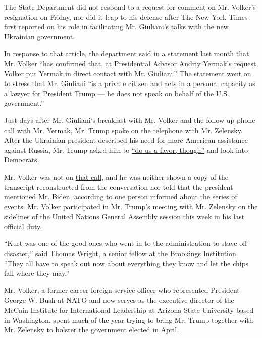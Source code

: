 The State Department did not respond to a request for comment on Mr.
Volker's resignation on Friday, nor did it leap to his defense after The
New York Times
\href{https://www.nytimes.com/2019/08/21/us/politics/giuliani-ukraine.html}{first
reported on his role} in facilitating Mr. Giuliani's talks with the new
Ukrainian government.

In response to that article, the department said in a statement last
month that Mr. Volker ``has confirmed that, at Presidential Advisor
Andriy Yermak's request, Volker put Yermak in direct contact with Mr.
Giuliani.'' The statement went on to stress that Mr. Giuliani ``is a
private citizen and acts in a personal capacity as a lawyer for
President Trump --- he does not speak on behalf of the U.S.
government.''

Just days after Mr. Giuliani's breakfast with Mr. Volker and the
follow-up phone call with Mr. Yermak, Mr. Trump spoke on the telephone
with Mr. Zelensky. After the Ukrainian president described his need for
more American assistance against Russia, Mr. Trump asked him to
\href{https://www.nytimes.com/2019/09/25/us/politics/donald-trump-impeachment-probe.html?module=inline}{``do
us a favor, though''} and look into Democrats.

Mr. Volker was not on
\href{https://www.nytimes.com/2019/09/26/us/politics/trump-ukraine-timeline.html?module=inline}{that
call}, and he was neither shown a copy of the transcript reconstructed
from the conversation nor told that the president mentioned Mr. Biden,
according to one person informed about the series of events. Mr. Volker
participated in Mr. Trump's meeting with Mr. Zelensky on the sidelines
of the United Nations General Assembly session this week in his last
official duty.

``Kurt was one of the good ones who went in to the administration to
stave off disaster,'' said Thomas Wright, a senior fellow at the
Brookings Institution. ``They all have to speak out now about everything
they know and let the chips fall where they may.''

Mr. Volker, a former career foreign service officer who represented
President George W. Bush at NATO and now serves as the executive
director of the McCain Institute for International Leadership at Arizona
State University based in Washington, spent much of the year trying to
bring Mr. Trump together with Mr. Zelensky to bolster the government
\href{https://www.nytimes.com/2019/04/21/world/europe/Volodymyr-Zelensky-ukraine-elections.html}{elected
in April}.

